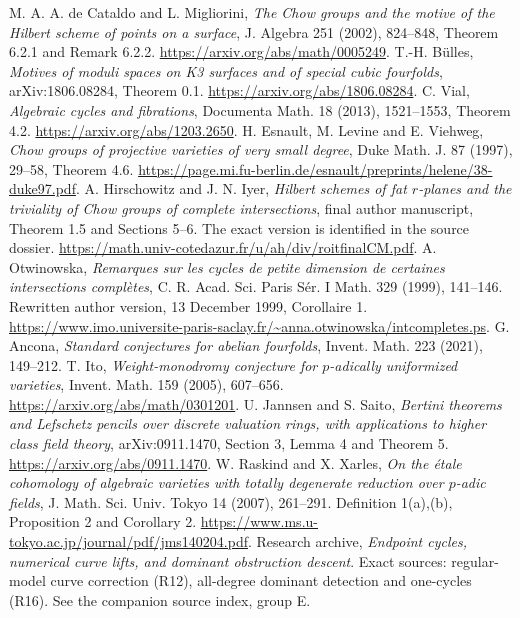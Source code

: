  M. A. A. de Cataldo and L. Migliorini,
\emph{The Chow groups and the motive of the Hilbert scheme of points
on a surface}, J. Algebra 251 (2002), 824--848, Theorem 6.2.1 and
Remark 6.2.2. \url{https://arxiv.org/abs/math/0005249}.
 T.-H. B\"ulles, \emph{Motives of moduli spaces on K3
surfaces and of special cubic fourfolds}, arXiv:1806.08284, Theorem 0.1.
\url{https://arxiv.org/abs/1806.08284}.
 C. Vial, \emph{Algebraic cycles and fibrations},
Documenta Math. 18 (2013), 1521--1553, Theorem 4.2.
\url{https://arxiv.org/abs/1203.2650}.
 H. Esnault, M. Levine and E. Viehweg,
\emph{Chow groups of projective varieties of very small degree},
Duke Math. J. 87 (1997), 29--58, Theorem 4.6.
\url{https://page.mi.fu-berlin.de/esnault/preprints/helene/38-duke97.pdf}.
 A. Hirschowitz and J. N. Iyer,
\emph{Hilbert schemes of fat $r$-planes and the triviality of Chow
groups of complete intersections}, final author manuscript,
Theorem 1.5 and Sections 5--6. The exact version is identified in
the source dossier.
\url{https://math.univ-cotedazur.fr/u/ah/div/roitfinalCM.pdf}.
 A. Otwinowska,
\emph{Remarques sur les cycles de petite dimension de certaines
intersections compl\`etes}, C. R. Acad. Sci. Paris S\'er. I Math.
329 (1999), 141--146. Rewritten author version, 13 December 1999,
Corollaire 1.
\url{https://www.imo.universite-paris-saclay.fr/~anna.otwinowska/intcompletes.ps}.
 G. Ancona, \emph{Standard conjectures for abelian
fourfolds}, Invent. Math. 223 (2021), 149--212.
 T. Ito, \emph{Weight-monodromy conjecture for
$p$-adically uniformized varieties}, Invent. Math. 159 (2005),
607--656. \url{https://arxiv.org/abs/math/0301201}.
 U. Jannsen and S. Saito,
\emph{Bertini theorems and Lefschetz pencils over discrete valuation
rings, with applications to higher class field theory},
arXiv:0911.1470, Section 3, Lemma 4 and Theorem 5.
\url{https://arxiv.org/abs/0911.1470}.
 W. Raskind and X. Xarles,
\emph{On the \'etale cohomology of algebraic varieties with totally degenerate
reduction over $p$-adic fields}, J. Math. Sci. Univ. Tokyo 14
(2007), 261--291. Definition 1(a),(b), Proposition 2 and Corollary 2.
\url{https://www.ms.u-tokyo.ac.jp/journal/pdf/jms140204.pdf}.
 Research archive,
\emph{Endpoint cycles, numerical curve lifts, and dominant
obstruction descent}. Exact sources: regular-model curve correction
(R12), all-degree dominant detection and one-cycles (R16).
See the companion source index, group E.
